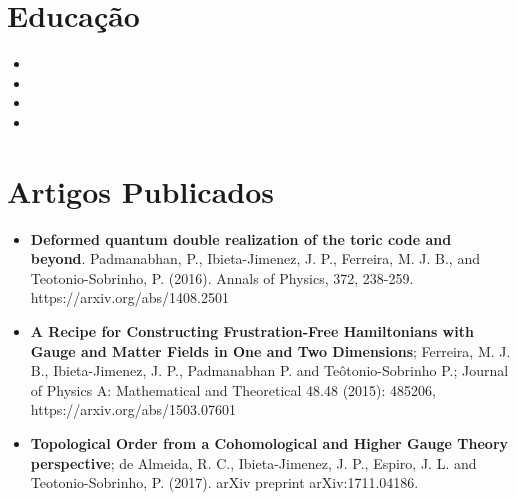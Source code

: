 \documentclass[11pt,a4paper,sans]{moderncv}        %
\begin{document}
\section{Educação}

\vspace{3pt}

\begin{itemize}

\item{}  %

\vspace{1pt}

\item{}

\vspace{1pt}
\item{}

\vspace{1pt}

\item{}  %


\end{itemize}


\section{Artigos Publicados}

\vspace{3pt}

\begin{itemize}
\item \textbf{Deformed quantum double realization of the toric code and beyond}. Padmanabhan, P., Ibieta-Jimenez, J. P., Ferreira, M. J. B., and Teotonio-Sobrinho, P. (2016). Annals of Physics, 372, 238-259. https://arxiv.org/abs/1408.2501
\vspace{1pt}
\item \textbf{A Recipe for Constructing Frustration-Free Hamiltonians with Gauge and Matter Fields in One and Two Dimensions}; Ferreira, M. J. B., Ibieta-Jimenez, J. P., Padmanabhan P.  and  Teôtonio-Sobrinho P.; Journal of Physics A: Mathematical and Theoretical 48.48 (2015): 485206, https://arxiv.org/abs/1503.07601

\item \textbf{Topological Order from a Cohomological and Higher Gauge Theory perspective}; de Almeida, R. C., Ibieta-Jimenez, J. P., Espiro, J. L. and Teotonio-Sobrinho, P. (2017). arXiv preprint arXiv:1711.04186.
\end{itemize}
\end{document}
